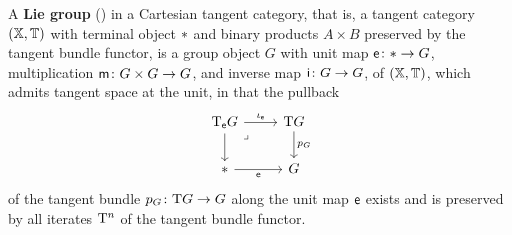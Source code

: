 \begin{content}
A \textbf{Lie group} (\cite[Definition~2.13]{lanfranchi:lie-correspondence-tangent-cats}) in a Cartesian tangent category, that is, a tangent category $(\mathbb{X},\mathbb{T})$ with terminal object $\ast$ and binary products $A\times B$ preserved by the tangent bundle functor, is a group object $G$ with unit map $\mathsf{e}\colon\ast\to G$, multiplication $\mathsf{m}\colon G\times G\to G$, and inverse map $\mathsf{i}\colon G\to G$, of $(\mathbb{X},\mathbb{T})$, which admits tangent space at the unit, in that the pullback
\begin{equation*}
\begin{tikzcd}
{\T_\e G} & {\T G} \\
{\*} & G
\arrow["{\iota_\e}", from=1-1, to=1-2]
\arrow[from=1-1, to=2-1]
\arrow["\lrcorner"{anchor=center, pos=0.125}, draw=none, from=1-1, to=2-2]
\arrow["{p_G}", from=1-2, to=2-2]
\arrow["\e"', from=2-1, to=2-2]
\end{tikzcd}
\end{equation*}
of the tangent bundle $p_G\colon\mathrm{T} G\to G$ along the unit map $\mathsf{e}$ exists and is preserved by all iterates $\mathrm{T}^n$ of the tangent bundle functor.
\end{content}

